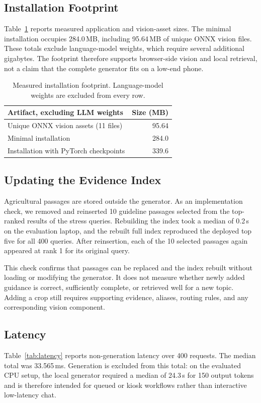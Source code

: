 \documentclass[11pt,a4paper]{article}
\begin{document}
\subsection{Installation Footprint}
Table~\ref{tab:footprint} reports measured application and vision-asset sizes. The minimal installation occupies 284.0\,MB, including 95.64\,MB of unique ONNX vision files. These totals exclude language-model weights, which require several additional gigabytes. The footprint therefore supports browser-side vision and local retrieval, not a claim that the complete generator fits on a low-end phone.

\begin{table}[t]
\centering
\small
\begin{tabular}{lr}
\toprule
\textbf{Artifact, excluding LLM weights} & \textbf{Size (MB)} \\
\midrule
Unique ONNX vision assets (11 files) & 95.64 \\
Minimal installation & 284.0 \\
Installation with PyTorch checkpoints & 339.6 \\
\bottomrule
\end{tabular}
\caption{Measured installation footprint. Language-model weights are excluded from every row.}
\label{tab:footprint}
\end{table}

\subsection{Updating the Evidence Index}
Agricultural passages are stored outside the generator. As an implementation check, we removed and reinserted 10 guideline passages selected from the top-ranked results of the stress queries. Rebuilding the index took a median of 0.2\,s on the evaluation laptop, and the rebuilt full index reproduced the deployed top five for all 400 queries. After reinsertion, each of the 10 selected passages again appeared at rank 1 for its original query.

This check confirms that passages can be replaced and the index rebuilt without loading or modifying the generator. It does not measure whether newly added guidance is correct, sufficiently complete, or retrieved well for a new topic. Adding a crop still requires supporting evidence, aliases, routing rules, and any corresponding vision component.

\subsection{Latency}
Table~\ref{tab:latency} reports non-generation latency over 400 requests. The median total was 33.565\,ms. Generation is excluded from this total: on the evaluated CPU setup, the local generator required a median of 24.3\,s for 150 output tokens and is therefore intended for queued or kiosk workflows rather than interactive low-latency chat.
\end{document}
